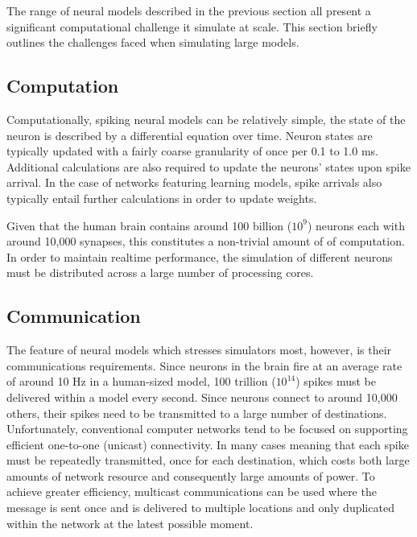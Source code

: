 		The range of neural models described in the previous section all present a
		significant computational challenge it simulate at scale. This section
		briefly outlines the challenges faced when simulating large models.
		
		
		\subsection{Computation}
			
			Computationally, spiking neural models can be relatively simple, the state
			of the neuron is described by a differential equation over time. Neuron
			states are typically updated with a fairly coarse granularity of once per
			0.1 to 1.0 ms. Additional calculations are also required to update the
			neurons' states upon spike arrival. In the case of networks featuring
			learning models, spike arrivals also typically entail further calculations
			in order to update weights.
			
			Given that the human brain contains around 100 billion ($10^9$) neurons
			each with around 10,000 synapses, this constitutes a non-trivial amount of
			of computation. In order to maintain realtime performance, the simulation
			of different neurons must be distributed across a large number of
			processing cores.
		
		\subsection{Communication}
			
			
			
			The feature of neural models which stresses simulators most, however, is
			their communications requirements. Since neurons in the brain fire at an
			average rate of around 10 Hz in a human-sized model, 100 trillion
			($10^{14}$) spikes must be delivered within a model every second. Since
			neurons connect to around 10,000 others, their spikes need to be
			transmitted to a large number of destinations. Unfortunately, conventional
			computer networks tend to be focused on supporting efficient one-to-one
			(unicast) connectivity. In many cases meaning that each spike must be
			repeatedly transmitted, once for each destination, which costs both large
			amounts of network resource and consequently large amounts of power. To
			achieve greater efficiency, multicast communications can be used where the
			message is sent once and is delivered to multiple locations and only
			duplicated within the network at the latest possible moment.
			
